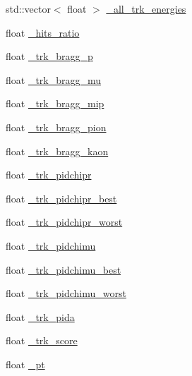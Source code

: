 \begin{DoxyCompactItemize}
\item 
std\+::vector$<$ float $>$ \hyperlink{classselection_1_1CC0piNpSelection_af7caaefffdb29a2e1faa921507f0f253}{\+\_\+all\+\_\+trk\+\_\+energies}
\item 
float \hyperlink{classselection_1_1CC0piNpSelection_a32b43003c9168115bc94544049e439a2}{\+\_\+hits\+\_\+ratio}
\item 
float \hyperlink{classselection_1_1CC0piNpSelection_a52d578481ee7dd4fed45f8e3c8ed44da}{\+\_\+trk\+\_\+bragg\+\_\+p}
\item 
float \hyperlink{classselection_1_1CC0piNpSelection_a9e7b081beb0ef9129f15a7fb965276f1}{\+\_\+trk\+\_\+bragg\+\_\+mu}
\item 
float \hyperlink{classselection_1_1CC0piNpSelection_aec1e4d27216773ec40bc66ab5c217abc}{\+\_\+trk\+\_\+bragg\+\_\+mip}
\item 
float \hyperlink{classselection_1_1CC0piNpSelection_a5371981bb5f02024c2ba1d986541ffd9}{\+\_\+trk\+\_\+bragg\+\_\+pion}
\item 
float \hyperlink{classselection_1_1CC0piNpSelection_ac9b23583581239191762cfb60307fb78}{\+\_\+trk\+\_\+bragg\+\_\+kaon}
\item 
float \hyperlink{classselection_1_1CC0piNpSelection_a712eaf6dc6086f1be5705a3bbe5226fc}{\+\_\+trk\+\_\+pidchipr}
\item 
float \hyperlink{classselection_1_1CC0piNpSelection_aaf0a2841494bc52da55d267bc3c8db3d}{\+\_\+trk\+\_\+pidchipr\+\_\+best}
\item 
float \hyperlink{classselection_1_1CC0piNpSelection_a6c06ff43f89cbee19cf466b830a6fe38}{\+\_\+trk\+\_\+pidchipr\+\_\+worst}
\item 
float \hyperlink{classselection_1_1CC0piNpSelection_a74ddf5622f3ee32110e9342361020a89}{\+\_\+trk\+\_\+pidchimu}
\item 
float \hyperlink{classselection_1_1CC0piNpSelection_a04216d0564f79f3c4a267130cd70e753}{\+\_\+trk\+\_\+pidchimu\+\_\+best}
\item 
float \hyperlink{classselection_1_1CC0piNpSelection_a9e88e0ae759d19106d964c13926fba4b}{\+\_\+trk\+\_\+pidchimu\+\_\+worst}
\item 
float \hyperlink{classselection_1_1CC0piNpSelection_af0fe49227e33b3f46015a821de58ba1f}{\+\_\+trk\+\_\+pida}
\item 
float \hyperlink{classselection_1_1CC0piNpSelection_a72517a224dc19f95faef3efde9a999d1}{\+\_\+trk\+\_\+score}
\item 
float \hyperlink{classselection_1_1CC0piNpSelection_a98281b58b33ff8c03fa9b00f3f3baa06}{\+\_\+pt}

\end{DoxyCompactItemize}
